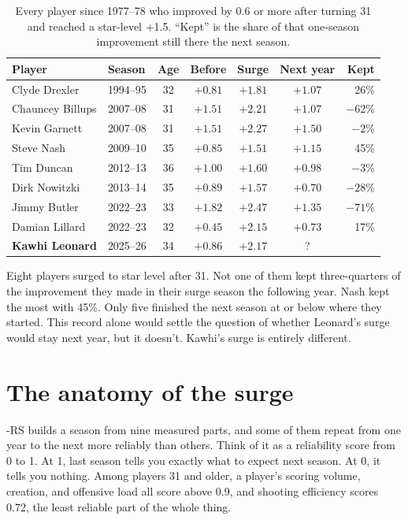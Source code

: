 \documentclass[11pt]{article}
\begin{document}
\begin{table}[H]
\centering\small
\caption{Every player since 1977--78 who improved by 0.6 or more after turning 31 and reached a
star-level +1.5. ``Kept'' is the share of that one-season improvement still there the next
season.}
\begin{tabular}{llccccr}
\toprule
Player & Season & Age & Before & Surge & Next year & Kept \\
\midrule
Clyde Drexler & 1994--95 & 32 & $+0.81$ & $+1.81$ & $+1.07$ & 26\% \\
Chauncey Billups & 2007--08 & 31 & $+1.51$ & $+2.21$ & $+1.07$ & $-62$\% \\
Kevin Garnett & 2007--08 & 31 & $+1.51$ & $+2.27$ & $+1.50$ & $-2$\% \\
Steve Nash & 2009--10 & 35 & $+0.85$ & $+1.51$ & $+1.15$ & 45\% \\
Tim Duncan & 2012--13 & 36 & $+1.00$ & $+1.60$ & $+0.98$ & $-3$\% \\
Dirk Nowitzki & 2013--14 & 35 & $+0.89$ & $+1.57$ & $+0.70$ & $-28$\% \\
Jimmy Butler & 2022--23 & 33 & $+1.82$ & $+2.47$ & $+1.35$ & $-71$\% \\
Damian Lillard & 2022--23 & 32 & $+0.45$ & $+2.15$ & $+0.73$ & 17\% \\
\midrule
\textbf{Kawhi Leonard} & 2025--26 & 34 & $+0.86$ & $\mathbf{+2.17}$ & ? & \\
\bottomrule
\end{tabular}
\label{tab:stars}
\end{table}

Eight players surged to star level after 31. Not one of them kept three-quarters of the
improvement they made in their surge season the following year. Nash kept the most with 45\%.
Only five finished the next season at or below where they started. This record alone would
settle the question of whether Leonard's surge would stay next year, but it doesn't. Kawhi's
surge is entirely different.

\section*{The anatomy of the surge}

\gravity-RS builds a season from nine measured parts, and some of them repeat from one year to the
next more reliably than others. Think of it as a reliability score from 0 to 1. At 1, last season
tells you exactly what to expect next season. At 0, it tells you nothing. Among players 31 and
older, a player's scoring volume, creation, and offensive load all score above 0.9, and shooting
efficiency scores 0.72, the least reliable part of the whole thing.
\end{document}
